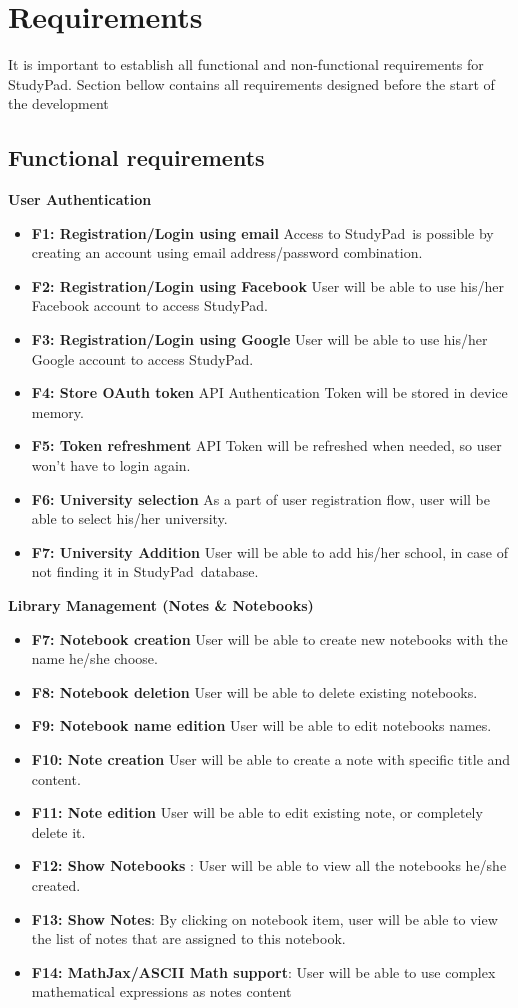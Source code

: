 \documentclass[thesis=B,english]{FITthesis}[2012/10/20]
\newcommand{\appname}{StudyPad}
\begin{document}
\newpage
\section{Requirements}
It is important to establish all functional and non-functional requirements for \appname. Section bellow contains all requirements designed before the start
of the development

\subsection{Functional requirements}
\bigskip
\textbf{User Authentication}
\begin{itemize}
	\item \textbf{F1: Registration/Login using email} Access to \appname\ is possible by creating an account using email address/password combination.
	\item \textbf{F2: Registration/Login using Facebook} User will be able to use his/her Facebook account to access \appname.
	\item \textbf{F3: Registration/Login using Google} User will be able to use his/her Google account to access \appname.
	\item \textbf{F4: Store OAuth token} API Authentication Token will be stored in device memory.
	\item \textbf{F5: Token refreshment} API Token will be refreshed when needed, so user won't have to login again.
	\item \textbf{F6: University selection} As a part of user registration flow, user will be able to select his/her university.
	\item \textbf{F7: University Addition} User will be able to add his/her school, in case of not finding it in \appname\ database.
\end{itemize}
\bigskip
\textbf{Library Management (Notes \& Notebooks)}
\begin{itemize}
	\item \textbf{F7: Notebook creation} User will be able to create new notebooks with the name he/she choose.
	\item \textbf{F8: Notebook deletion} User will be able to delete existing notebooks.
	\item \textbf{F9: Notebook name edition} User will be able to edit notebooks names.
	\item \textbf{F10: Note creation} User will be able to create a note with specific title and content.
	\item \textbf{F11: Note edition} User will be able to edit existing note, or completely delete it.
	\item \textbf{F12: Show Notebooks} : User will be able to view all the notebooks he/she created.
	\item \textbf{F13: Show Notes}: By clicking on notebook item, user will be able to view the list of notes that are assigned to this notebook.
	\item \textbf{F14: MathJax/ASCII Math support}: User will be able to use complex mathematical expressions as notes content
\end{itemize}
\end{document}
